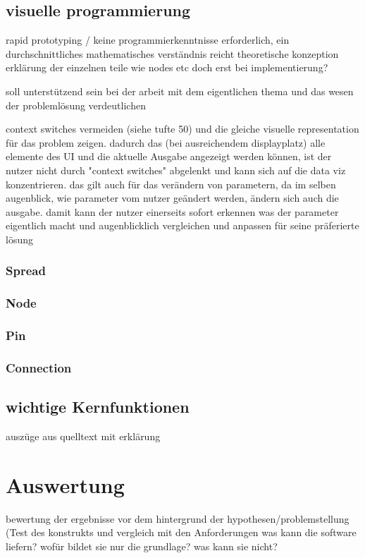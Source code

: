 \documentclass[a4paper, 12pt, DIVcalc, onepage, pdftex, headsepline, footsepline]{scrreprt}
\begin{document}
\section{visuelle programmierung}
\label{sec:visPro}
rapid prototyping / keine programmierkenntnisse erforderlich, ein durchschnittliches mathematisches verständnis reicht
theoretische konzeption
erklärung der einzelnen teile wie nodes etc doch erst bei implementierung?

soll unterstützend sein bei der arbeit mit dem eigentlichen thema und das wesen der problemlösung verdeutlichen

context switches vermeiden (siehe tufte 50) und die gleiche visuelle representation für das problem zeigen.
dadurch das (bei ausreichendem displayplatz) alle elemente des UI und die aktuelle Ausgabe angezeigt werden können, ist der nutzer nicht durch "context switches" abgelenkt und kann sich auf die data viz konzentrieren.
das gilt auch für das verändern von parametern, da im selben augenblick, wie parameter vom nutzer geändert werden, ändern sich auch die ausgabe.
damit kann der nutzer einerseits sofort erkennen was der parameter eigentlich macht und augenblicklich vergleichen und anpassen für seine präferierte lösung
\subsection{Spread}
\subsection{Node}
\subsection{Pin}
\subsection{Connection}
\section{wichtige Kernfunktionen}
\label{sec:Kernfunktionen}
auszüge aus quelltext mit erklärung
\chapter{Auswertung}
\label{cha:Auswertung}
bewertung der ergebnisse vor dem hintergrund der hypothesen/problemstellung (Test des konstrukts und vergleich mit den Anforderungen
was kann die software liefern? wofür bildet sie nur die grundlage? was kann sie nicht?
\end{document}
